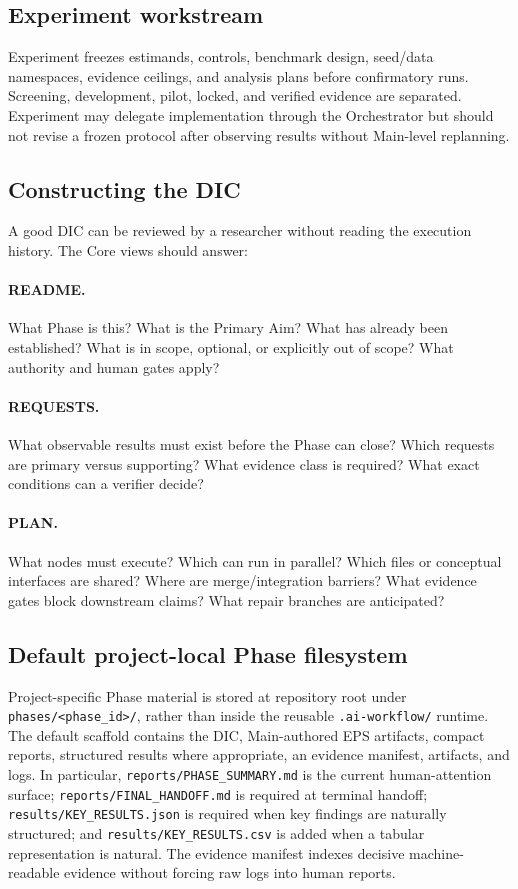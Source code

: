 \documentclass[11pt,a4paper]{article}
\begin{document}
\subsection{Experiment workstream}
Experiment freezes estimands, controls, benchmark design, seed/data namespaces, evidence ceilings, and analysis plans before confirmatory runs. Screening, development, pilot, locked, and verified evidence are separated. Experiment may delegate implementation through the Orchestrator but should not revise a frozen protocol after observing results without Main-level replanning.

\subsection{Constructing the DIC}
A good DIC can be reviewed by a researcher without reading the execution history. The Core views should answer:
\paragraph{README.} What Phase is this? What is the Primary Aim? What has already been established? What is in scope, optional, or explicitly out of scope? What authority and human gates apply?
\paragraph{REQUESTS.} What observable results must exist before the Phase can close? Which requests are primary versus supporting? What evidence class is required? What exact conditions can a verifier decide?
\paragraph{PLAN.} What nodes must execute? Which can run in parallel? Which files or conceptual interfaces are shared? Where are merge/integration barriers? What evidence gates block downstream claims? What repair branches are anticipated?

\subsection{Default project-local Phase filesystem}
Project-specific Phase material is stored at repository root under \texttt{phases/<phase\_id>/}, rather than inside the reusable \texttt{.ai-workflow/} runtime. The default scaffold contains the DIC, Main-authored EPS artifacts, compact reports, structured results where appropriate, an evidence manifest, artifacts, and logs. In particular, \texttt{reports/PHASE\_SUMMARY.md} is the current human-attention surface; \texttt{reports/FINAL\_HANDOFF.md} is required at terminal handoff; \texttt{results/KEY\_RESULTS.json} is required when key findings are naturally structured; and \texttt{results/KEY\_RESULTS.csv} is added when a tabular representation is natural. The evidence manifest indexes decisive machine-readable evidence without forcing raw logs into human reports.
\end{document}
